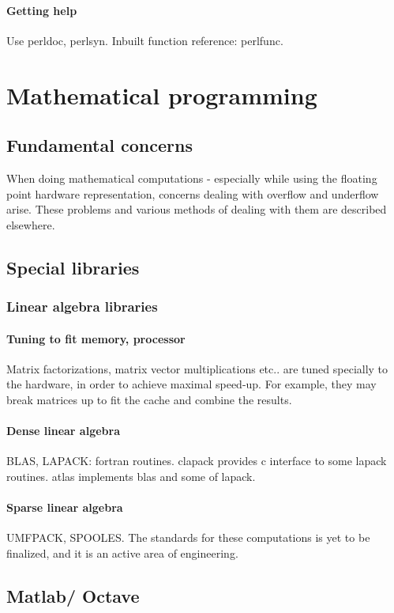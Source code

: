 \subsection{Getting help}
Use perldoc, perlsyn. Inbuilt function reference: perlfunc.

\part{Mathematical programming}
\chapter{Fundamental concerns}
When doing mathematical computations - especially while using the floating point hardware representation, concerns dealing with overflow and underflow arise. These problems and various methods of dealing with them are described elsewhere.

\chapter{Special libraries}
\section{Linear algebra libraries}
\subsection{Tuning to fit memory, processor}
Matrix factorizations, matrix vector multiplications etc.. are tuned specially to the hardware, in order to achieve maximal speed-up. For example, they may break matrices up to fit the cache and combine the results.

\subsection{Dense linear algebra}
BLAS, LAPACK: fortran routines. clapack provides c interface to some lapack routines. atlas implements blas and some of lapack.

\subsection{Sparse linear algebra}
UMFPACK, SPOOLES. The standards for these computations is yet to be finalized, and it is an active area of engineering.

\chapter{Matlab/ Octave}
